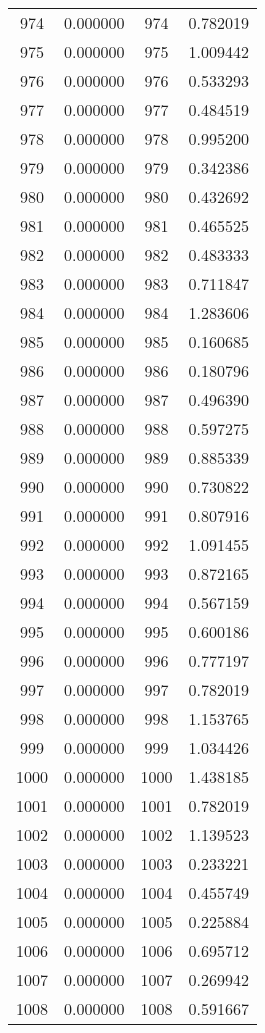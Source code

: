 \documentclass[12pt]{article}
\begin{document}
\begin{longtable}{@{}cccc@{}}
974 & 0.000000 & 974 & 0.782019 \\
975 & 0.000000 & 975 & 1.009442 \\
976 & 0.000000 & 976 & 0.533293 \\
977 & 0.000000 & 977 & 0.484519 \\
978 & 0.000000 & 978 & 0.995200 \\
979 & 0.000000 & 979 & 0.342386 \\
980 & 0.000000 & 980 & 0.432692 \\
981 & 0.000000 & 981 & 0.465525 \\
982 & 0.000000 & 982 & 0.483333 \\
983 & 0.000000 & 983 & 0.711847 \\
984 & 0.000000 & 984 & 1.283606 \\
985 & 0.000000 & 985 & 0.160685 \\
986 & 0.000000 & 986 & 0.180796 \\
987 & 0.000000 & 987 & 0.496390 \\
988 & 0.000000 & 988 & 0.597275 \\
989 & 0.000000 & 989 & 0.885339 \\
990 & 0.000000 & 990 & 0.730822 \\
991 & 0.000000 & 991 & 0.807916 \\
992 & 0.000000 & 992 & 1.091455 \\
993 & 0.000000 & 993 & 0.872165 \\
994 & 0.000000 & 994 & 0.567159 \\
995 & 0.000000 & 995 & 0.600186 \\
996 & 0.000000 & 996 & 0.777197 \\
997 & 0.000000 & 997 & 0.782019 \\
998 & 0.000000 & 998 & 1.153765 \\
999 & 0.000000 & 999 & 1.034426 \\
1000 & 0.000000 & 1000 & 1.438185 \\
1001 & 0.000000 & 1001 & 0.782019 \\
1002 & 0.000000 & 1002 & 1.139523 \\
1003 & 0.000000 & 1003 & 0.233221 \\
1004 & 0.000000 & 1004 & 0.455749 \\
1005 & 0.000000 & 1005 & 0.225884 \\
1006 & 0.000000 & 1006 & 0.695712 \\
1007 & 0.000000 & 1007 & 0.269942 \\
1008 & 0.000000 & 1008 & 0.591667 \\

\end{longtable}
\end{document}
